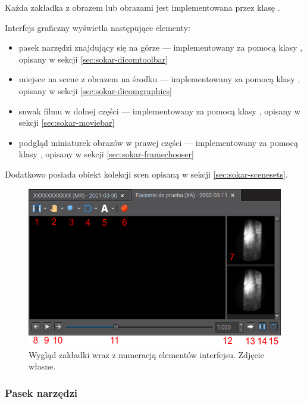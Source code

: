 \label{sec:sokar-dicomview}
\par
Każda zakładka z obrazem lub obrazami jest implementowana przez klasę .

\par
Interfejs graficzny  wyświetla następujące elementy:
\begin{itemize}
    \item pasek narzędzi znajdujący się na górze --- implementowany za pomocą klasy , opisany w sekcji \ref{sec:sokar-dicomtoolbar}
    \item miejsce na scene z obrazem \DICOM na środku --- implementowany za pomocą klasy , opisany w sekcji \ref{sec:sokar-dicomgraphics}
    \item suwak filmu w dolnej części --- implementowany za pomocą klasy , opisany w sekcji \ref{sec:sokar-moviebar}
    \item podgląd miniaturek obrazów w prawej części --- implementowany za pomocą klasy , opisany w sekcji \ref{sec:sokar-framechooser}
\end{itemize}

\par
Dodatkowo posiada obiekt kolekcji scen opisaną w sekcji \ref{sec:sokar-scenesets}.

\begin{figure}[!htbp]
    \centering
    \includegraphics[width=\textwidth]{img/sokar-dicomview-001.png}
    \caption{Wygląd zakładki wraz z numeracją elementów interfejsu. Zdjęcie własne.}
    \label{fig:sokar-dicomview001}
\end{figure}

\subsubsection{Pasek narzędzi}


